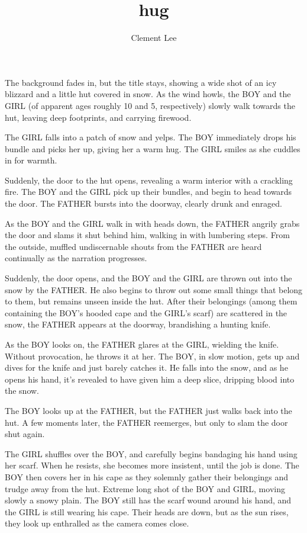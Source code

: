 \documentclass{screenplay}
\title{hug}
\author{Clement Lee}
\begin{document}
\fadein
{}
The background fades in, but the title stays, showing a wide shot of an icy blizzard and a little hut covered in snow.
As the wind howls, the BOY and the GIRL (of apparent ages roughly 10 and 5, respectively) slowly walk towards the hut, leaving deep footprints, and carrying firewood.

The GIRL falls into a patch of snow and yelps.
The BOY immediately drops his bundle and picks her up, giving her a warm hug.
The GIRL smiles as she cuddles in for warmth.

Suddenly, the door to the hut opens, revealing a warm interior with a crackling fire.
The BOY and the GIRL pick up their bundles, and begin to head towards the door.
The FATHER bursts into the doorway, clearly drunk and enraged.

As the BOY and the GIRL walk in with heads down, the FATHER angrily grabs the door and slams it shut behind him, walking in with lumbering steps.
From the outside, muffled undiscernable shouts from the FATHER are heard continually as the narration progresses.

Suddenly, the door opens, and the BOY and the GIRL are thrown out into the snow by the FATHER.
He also begins to throw out some small things that belong to them, but remains unseen inside the hut.
After their belongings (among them containing the BOY's hooded cape and the GIRL's scarf) are scattered in the snow, the FATHER appears at the doorway, brandishing a hunting knife.

As the BOY looks on, the FATHER glares at the GIRL, wielding the knife.
Without provocation, he throws it at her.
The BOY, in slow motion, gets up and dives for the knife and just barely catches it.
He falls into the snow, and as he opens his hand, it's revealed to have given him a deep slice, dripping blood into the snow.

The BOY looks up at the FATHER, but the FATHER just walks back into the hut.
A few moments later, the FATHER reemerges, but only to slam the door shut again.

The GIRL shuffles over the BOY, and carefully begins bandaging his hand using her scarf.
When he resists, she becomes more insistent, until the job is done.
The BOY then covers her in his cape as they solemnly gather their belongings and trudge away from the hut.
Extreme long shot of the BOY and GIRL, moving slowly a snowy plain.
The BOY still has the scarf wound around his hand, and the GIRL is still wearing his cape.
Their heads are down, but as the sun rises, they look up enthralled as the camera comes close.
\end{document}
